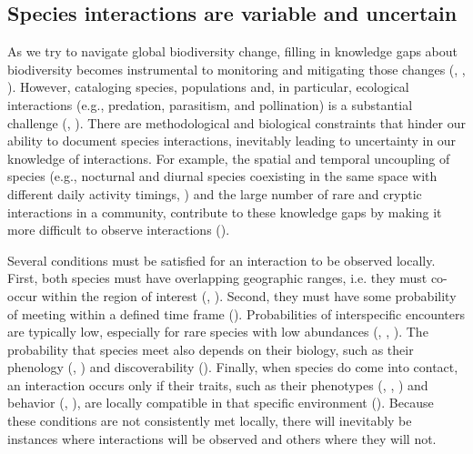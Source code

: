 \subsection{Species interactions are variable and uncertain}

As we try to navigate global biodiversity change, filling in knowledge gaps
about biodiversity becomes instrumental to monitoring and mitigating those
changes (\cite{Hortal2015Seven}, \cite{Gonzalez2022Monitor},
\cite{Abrego2021Accounting}). However, cataloging species, populations and, in
particular, ecological interactions (e.g., predation, parasitism, and
pollination) is a substantial challenge (\cite{Polis1991Complex},
\cite{Pascual2006Ecological}). There are methodological and biological
constraints that hinder our ability to document species interactions, inevitably
leading to uncertainty in our knowledge of interactions. For example, the
spatial and temporal uncoupling of species (e.g., nocturnal and diurnal species
coexisting in the same space with different daily activity timings,
\cite{Jordano1987Patterns}) and the large number of rare and cryptic
interactions in a community, contribute to these knowledge gaps by making it
more difficult to observe interactions (\cite{Jordano2016Sampling}). 

Several conditions must be satisfied for an interaction to be observed locally.
First, both species must have overlapping geographic ranges, i.e. they must
co-occur within the region of interest (\cite{Morales-Castilla2015Inferring},
\cite{Cazelles2016Theorya}). Second, they must have some probability of meeting
within a defined time frame (\cite{Poisot2015Species}). Probabilities of
interspecific encounters are typically low, especially for rare species with low
abundances (\cite{Vazquez2007Species}, \cite{Canard2012Emergence},
\cite{Canard2014Empirical}). The probability that species meet also depends on
their biology, such as their phenology (\cite{Olesen2010Missing},
\cite{Singer2012Geographic}) and discoverability (\cite{Broom2005You}). Finally,
when species do come into contact, an interaction occurs only if their traits,
such as their phenotypes (\cite{Bolnick2011Why}, \cite{Stouffer2011Role},
\cite{Gravel2013Inferring}) and behavior (\cite{Pulliam1974Theory},
\cite{Choh2012Predatorprey}), are locally compatible in that specific
environment (\cite{Poisot2015Species}). Because these conditions are not
consistently met locally, there will inevitably be instances where interactions
will be observed and others where they will not.

